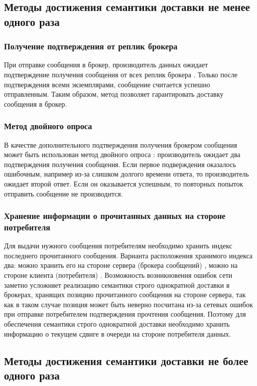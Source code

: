 \subsection{Методы достижения семантики доставки не менее одного раза}
\subsubsection{Получение подтверждения от реплик брокера}
При отправке сообщения в брокер, производитель данных ожидает подтверждение получения сообщения от всех реплик брокера \cite{bib:8}. Только после подтверждения всеми экземплярами, сообщение считается успешно отправленным. Таким образом, метод позволяет гарантировать доставку сообщения в брокер.

\subsubsection{Метод двойного опроса}
В качестве дополнительного подтверждения получения брокером сообщения может быть использован метод двойного опроса \cite{bib:13}: производитель ожидает два подтверждения получения сообщения.
Если первое подверждения оказалось ошибочным, например из-за слишком долгого времени ответа, то производитель ожидает второй ответ. Если он оказывается успешным, то повторных попыток отправить сообщение не производится.

\subsubsection{Хранение информации о прочитанных данных на стороне потребителя}
\label{subsubsection:consumer}
Для выдачи нужного сообщения потребителям необходимо хранить индекс последнего прочитанного сообщения. 
Варианта расположения хранимого индекса два: можно хранить его на стороне сервера (брокера сообщений) \cite{bib:9}, можно на стороне клиента (потребителя) \cite{bib:10}. 
Возможность возникновения ошибок сети заметно усложняет реализацию семантики строго однократной доставки в брокерах, хранящих позицию прочитанного сообщения на стороне сервера, так как в таком случае позиция может быть неверно посчитана из-за сетевых ошибок при отправке потребителем подтверждения прочтения сообщения. 
Поэтому для обеспечения семантики строго однократной доставки необходимо хранить информацию о текущем сдвиге в очереди на стороне потребителя данных.

\subsection{Методы достижения семантики доставки не более одного раза}
